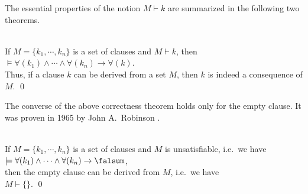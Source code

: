 The essential properties of the notion $M \vdash k$ are summarized in the following two theorems.

\begin{Satz}  \hspace*{\fill} \\
    If $M = \{k_1,\cdots,k_n\}$ is a set of clauses and $M \vdash k$, then \\[0.2cm]
    \hspace*{1.3cm} $\models \forall(k_1) \wedge \cdots \wedge \forall(k_n) \rightarrow \forall(k)$. \\[0.2cm]
    Thus, if a clause $k$ can be derived from a set $M$, 
    then $k$ is indeed a consequence of $M$. \qed
\end{Satz}

\noindent
The converse of the above correctness theorem holds only for the empty clause. It was proven in 1965 by John
A.~Robinson \cite{robinson:1965}. 
\begin{Satz}
   \hspace*{\fill} \\
  If $M = \{k_1,\cdots,k_n\}$ is a set of clauses and $M$ is unsatisfiable, i.e.~we have
  \\[0.2cm]
  \hspace*{1.3cm}
  $\models \forall(k_1) \wedge \cdots \wedge \forall(k_n) \rightarrow \falsum$, 
  \\[0.2cm]
  then the empty clause can be derived from $M$, i.e.~we have
  \\[0.2cm]
  \hspace*{1.3cm} $M \vdash \{\}$.     \qed
\end{Satz}

